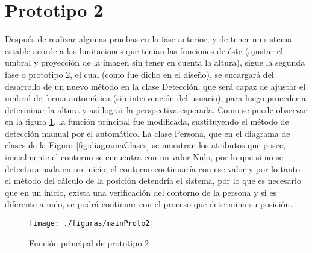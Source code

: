 \documentclass[a4paper,openright,12pt]{report}
\begin{document}
\section{Prototipo 2}
Después de realizar algunas pruebas en la fase anterior, y de tener un sistema estable acorde a las limitaciones que tenían las funciones de éste (ajustar el umbral y proyección de la imagen sin tener en cuenta la altura), sigue la segunda fase o prototipo 2, el cual (como fue dicho en el diseño), se encargará del desarrollo de un nuevo método en la clase Detección, que será capaz de ajustar el umbral de forma automática (sin intervención del usuario), para luego proceder a determinar la altura y así lograr la perspectiva esperada. Como se puede observar en la figura \ref{fig:mainProto2}, la función principal fue modificada, sustituyendo el método de detección manual por el automático. La clase Persona, que en el diagrama de clases de la Figura \ref{fig:diagramaClases} se muestran los atributos que posee,  inicialmente el contorno se encuentra con un valor Nulo, por lo que si no se detectara nada en un inicio, el contorno continuaría con ese valor y por lo tanto el método del cálculo de la posición detendría el sistema, por lo que es necesario que en un inicio, exista una verificación del contorno de la persona y si es diferente a nulo, se podrá continuar con el proceso que determina su posición.
\begin{figure}[thb]
	\centering
	\texttt{[image: ./figuras/mainProto2]}
	\caption{Función principal de prototipo 2} 
	\label{fig:mainProto2}
\end{figure}
\end{document}
